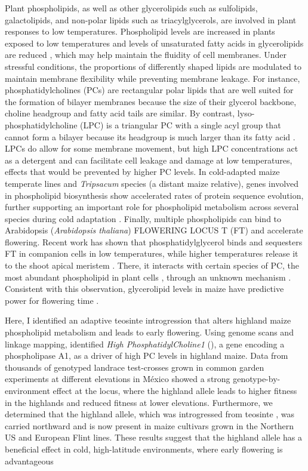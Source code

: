 Plant phospholipids, as well as other glycerolipids such as sulfolipids, galactolipids, and non-polar lipids such as triacylglycerols, are involved in plant responses to low temperatures.
Phospholipid levels are increased in plants exposed to low temperatures \citep{degenkolbe2012-wf} and levels of unsaturated fatty acids in glycerolipids are reduced \citep{welti2002-uk, lynch1987-ln}, which may help maintain the fluidity of cell membranes.
Under stressful conditions, the proportions of differently shaped lipids are modulated to maintain membrane flexibility while preventing membrane leakage. 
For instance, phosphatidylcholines (PCs) are rectangular polar lipids that are well suited for the formation of bilayer membranes because the size of their glycerol backbone, choline headgroup and fatty acid tails are similar.
By contrast, lyso-phosphatidylcholine (LPC) is a triangular PC with a single acyl group that cannot form a bilayer because its headgroup is much larger than its fatty acid \citep{jouhet2013-fv}.
LPCs do allow for some membrane movement, but high LPC concentrations act as a detergent \citep{henriksen2010-cm} and can facilitate cell leakage and damage at low temperatures, effects that would be prevented by higher PC levels.
In cold-adapted maize temperate lines and \textit{Tripsacum} species (a distant maize relative), genes involved in  phospholipid biosynthesis show accelerated rates of protein sequence evolution, further supporting an important role for phospholipid metabolism across several species during cold adaptation \citep{yan2019-tx}. 
Finally, multiple phospholipids can bind to Arabidopsis (\textit{Arabidopsis thaliana}) FLOWERING LOCUS T (FT) and accelerate flowering.
Recent work has shown that phosphatidylglycerol binds and sequesters FT in companion cells in low temperatures, while higher temperatures release it to the shoot apical meristem \citep{susila2021-dz}.
There, it interacts with certain species of PC, the most abundant phospholipid in plant cells \citep{gu2017-nd},  through an unknown mechanism \citep{nakamura2014-qf}. 
Consistent with this observation, glycerolipid levels in maize have predictive power for flowering time \citep{riedelsheimer2013-bd}. 

Here, I identified an adaptive teosinte \mex introgression that alters highland maize phospholipid metabolism and leads to early flowering.
Using genome scans and linkage mapping,  identified \textit{High PhosphatidylCholine1} (\hpc), a gene encoding a phospholipase A1, as a driver of high PC levels in highland maize. 
Data from thousands of genotyped landrace test-crosses grown in common garden experiments at different elevations in M\'exico showed a strong genotype-by-environment effect at the \hpc locus, where the highland allele leads to higher fitness in the highlands and reduced fitness at lower elevations.
Furthermore, we determined that the highland \hpc allele, which was introgressed from teosinte \mex, was carried northward and is now present in maize cultivars grown in the Northern US and European Flint lines.
These results suggest that the \hpc highland allele has a beneficial effect in cold, high-latitude environments, where early flowering is advantageous


